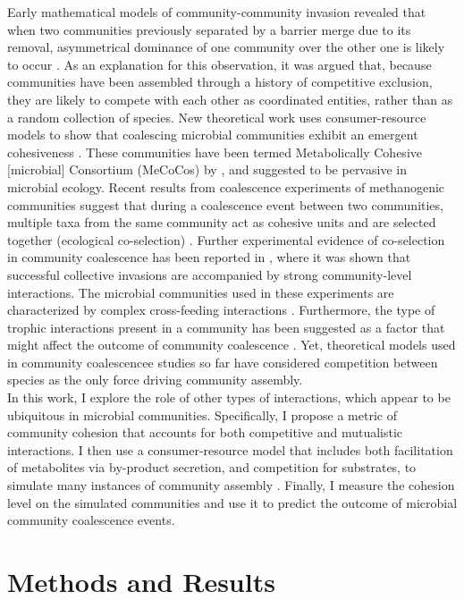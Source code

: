 \documentclass[titlepage,11pt]{article}
\begin{document}
\begin{linenumbers}
			Early mathematical models of community-community invasion revealed that when two communities previously separated by a barrier merge due to its removal, asymmetrical dominance of one community over the other one is likely to occur \citep{Gilpin1994, Toquenaga1997}. As an explanation for this observation, it was argued that, because communities have been assembled through a history of competitive exclusion, they are likely to compete with each other as coordinated entities, rather than as a random collection of species. New theoretical work uses consumer-resource models to show that coalescing microbial communities exhibit an emergent cohesiveness \citep{Tikhonov2016, Tikhonov2017}. These  communities have been termed Metabolically Cohesive [microbial] Consortium (MeCoCos) by \citet{Pascual-Garcia2020}, and suggested to be pervasive in microbial ecology. Recent results from coalescence experiments of methanogenic communities suggest that during a coalescence event between two communities, multiple taxa from the same community act as cohesive units and are selected together (ecological co-selection) \citep{Sierocinski2017}. Further experimental evidence of co-selection in community coalescence has been reported in \citet{Lu2018}, where it was shown that successful collective invasions are accompanied by strong community-level interactions. The microbial communities used in these experiments are characterized by complex cross-feeding interactions \citep{Hansen2007, Lawrence2012, Embree2015}. Furthermore, the type of trophic interactions present in a community has been suggested as a factor that might affect the outcome of community coalescence \citep{Castledine2020}.  Yet, theoretical models used in community coalescencee studies so far have considered competition between species as the only force driving community assembly.\\
			In this work, I explore the role of other types of interactions, which appear to be ubiquitous in microbial communities. Specifically, I propose a metric of community cohesion that accounts for both competitive and mutualistic interactions. I then use a consumer-resource model that includes both facilitation of metabolites via by-product secretion, and competition for substrates, to simulate many instances of community assembly . Finally, I measure the cohesion level on the simulated communities and use it to predict the outcome of microbial community coalescence events. 
		\section{Methods and Results}

\end{linenumbers}
\end{document}

